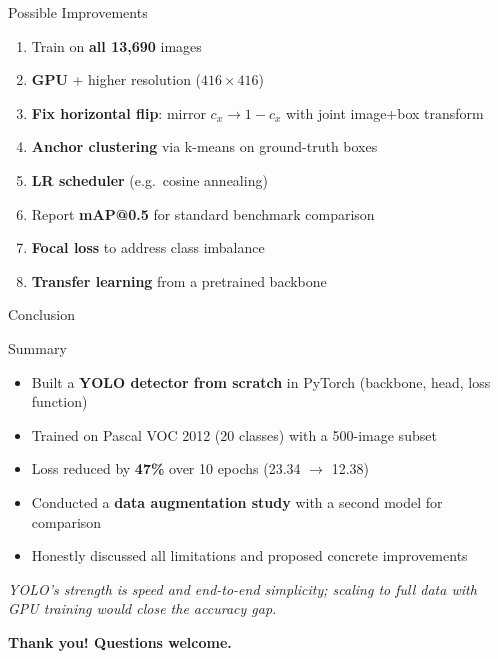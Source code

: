 \documentclass[aspectratio=169,10pt]{beamer}
\begin{document}
\begin{frame}{Possible Improvements}
  \begin{block}{}
    \begin{enumerate}\setlength\itemsep{4pt}
      \item Train on \textbf{all 13,690} images
      \item \textbf{GPU} + higher resolution ($416\times416$)
      \item \textbf{Fix horizontal flip}: mirror $c_x \to 1-c_x$ with joint image+box transform
      \item \textbf{Anchor clustering} via k-means on ground-truth boxes
      \item \textbf{LR scheduler} (e.g.\ cosine annealing)
      \item Report \textbf{mAP@0.5} for standard benchmark comparison
      \item \textbf{Focal loss} to address class imbalance
      \item \textbf{Transfer learning} from a pretrained backbone
    \end{enumerate}
  \end{block}
\end{frame}
\begin{frame}{Conclusion}
 
      \begin{block}{Summary}
        \begin{itemize}
      \item  Built a \textbf{YOLO detector from scratch}
        in PyTorch (backbone, head, loss function)
      \item Trained on Pascal VOC 2012 (20 classes)
        with a 500-image subset
      \item  Loss reduced by \textbf{47\%} over 10 epochs
        (23.34 $\to$ 12.38)
      \item  Conducted a \textbf{data augmentation study}
        with a second model for comparison
      \item Honestly discussed all limitations and
        proposed concrete improvements
    \end{itemize}
      \end{block}
      \vspace{4pt}
      \vspace{0.1cm}
  \textit{YOLO's strength is speed and end-to-end simplicity; scaling to
  full data with GPU training would close the accuracy gap.}
  \vspace{4pt}
  \begin{center}
    \large\color{navyblue}\bfseries Thank you! \quad Questions welcome.
  \end{center}
\end{frame}





 
\end{document}
